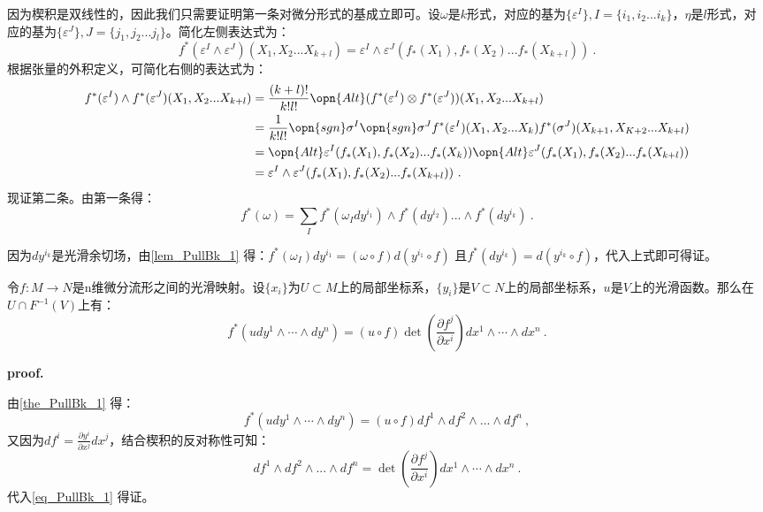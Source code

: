 因为楔积是双线性的，因此我们只需要证明第一条对微分形式的基成立即可。设$\omega$是$k$形式，对应的基为$\{\varepsilon^I\},I=\{i_1,i_2...i_k\}$，$\eta$是$l$形式，对应的基为$\{\varepsilon^J\},J=\{j_1,j_2...j_l\}$。简化左侧表达式为：
\begin{equation}
f^*(\varepsilon^I\wedge \varepsilon^J)(X_{1},X_{2}...X_{k+l})=\varepsilon^I\wedge \varepsilon^J(f_*(X_{1}),f_*(X_{2})...f_*(X_{k+l}))~.
\end{equation}
根据张量的外积定义，可简化右侧的表达式为：
\begin{equation}
\begin{aligned}
f^*(\varepsilon^I)\wedge f^*(\varepsilon^J)(X_{1},X_{2}...X_{k+l})&=\frac{(k+l)!}{k!l!}\opn{Alt}(f^*(\varepsilon^I)\otimes f^*(\varepsilon^J))(X_{1},X_{2}...X_{k+l})\\
&=\frac{1}{k!l!}\opn{sgn}\sigma^I\opn{sgn}\sigma^Jf^*(\varepsilon^I)(X_1,X_2...X_k)f^*(\sigma^J)(X_{k+1},X_{K+2}...X_{k+l})\\
&=\opn{Alt}\varepsilon^I(f_*(X_1),f_*(X_2)...f_*(X_k))\opn{Alt}\varepsilon^J(f_*(X_1),f_*(X_2)...f_*(X_{k+l}))\\
&=\varepsilon^I\wedge\varepsilon^J(f_*(X_{1}),f_*(X_{2})...f_*(X_{k+l}))~.
\end{aligned}
\end{equation}
现证第二条。由第一条得：
\begin{equation}
f^*(\omega)=\sum_If^*(\omega_I dy^{i_1} )\wedge f^*(dy^{i_2})...\wedge f^*(dy^{i_k})~.
\end{equation}

因为$dy^{i_k}$是光滑余切场，由\autoref{lem_PullBk_1} 得：$f^*(\omega_I)dy^{i_1}=(\omega\circ f)d(y^{i_1}\circ f)$
且$f^*(dy^{i_k})=d(y^{i_k}\circ f)$，代入上式即可得证。

\begin{theorem}{}
令$f:M\rightarrow N$是n维微分流形之间的光滑映射。设$\{x_i\}$为$U\subset M$上的局部坐标系，$\{y_i\}$是$V\subset N$上的局部坐标系，$u$是$V$上的光滑函数。那么在$U\cap F^{-1}(V)$上有：
\begin{equation}
f^*\left(u d y^1 \wedge \cdots \wedge d y^n\right)=(u \circ f) \operatorname{det}\left(\frac{\partial f^j}{\partial x^i}\right) d x^1 \wedge \cdots \wedge d x^n~.
\end{equation}
\end{theorem}
\textbf{proof.}

由\autoref{the_PullBk_1} 得：
\begin{equation}\label{eq_PullBk_1}
f^*\left(u d y^1 \wedge \cdots \wedge d y^n\right)=(u \circ f) df^1\wedge df^2\wedge ...\wedge  df^n~,
\end{equation}
又因为$df^i=\frac{\partial y^i}{\partial x^j}dx^j$，结合楔积的反对称性可知：
\begin{equation}
df^1\wedge df^2\wedge ...\wedge  df^n=\operatorname{det}\left(\frac{\partial f^j}{\partial x^i}\right) d x^1 \wedge \cdots \wedge d x^n~.
\end{equation}
代入\autoref{eq_PullBk_1} 得证。